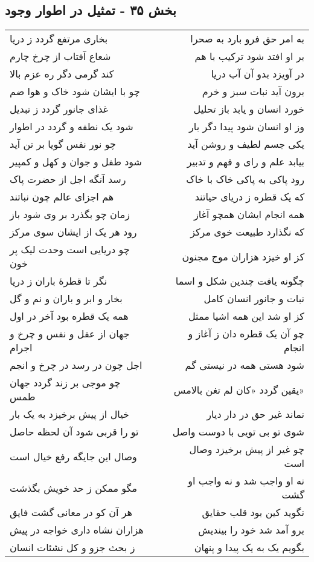 \begin{center}
\section*{بخش ۳۵ - تمثیل در اطوار وجود}
\label{sec:sh035}
\begin{longtable}{l p{0.5cm} r}
بخاری مرتفع گردد ز دریا
&&
به امر حق فرو بارد به صحرا
\\
شعاع آفتاب از چرخ چارم
&&
بر او افتد شود ترکیب با هم
\\
کند گرمی دگر ره عزم بالا
&&
در آویزد بدو آن آب دریا
\\
چو با ایشان شود خاک و هوا ضم
&&
برون آید نبات سبز و خرم
\\
غذای جانور گردد ز تبدیل
&&
خورد انسان و یابد باز تحلیل
\\
شود یک نطفه و گردد در اطوار
&&
وز او انسان شود پیدا دگر بار
\\
چو نور نفس گویا بر تن آید
&&
یکی جسم لطیف و روشن آید
\\
شود طفل و جوان و کهل و کمپیر
&&
بیابد علم و رای و فهم و تدبیر
\\
رسد آنگه اجل از حضرت پاک
&&
رود پاکی به پاکی خاک با خاک
\\
هم اجزای عالم چون نباتند
&&
که یک قطره ز دریای حیاتند
\\
زمان چو بگذرد بر وی شود باز
&&
همه انجام ایشان همچو آغاز
\\
رود هر یک از ایشان سوی مرکز
&&
که نگذارد طبیعت خوی مرکز
\\
چو دریایی است وحدت لیک پر خون
&&
کز او خیزد هزاران موج مجنون
\\
نگر تا قطرهٔ باران ز دریا
&&
چگونه یافت چندین شکل و اسما
\\
بخار و ابر و باران و نم و گل
&&
نبات و جانور انسان کامل
\\
همه یک قطره بود آخر در اول
&&
کز او شد این همه اشیا ممثل
\\
جهان از عقل و نفس و چرخ و اجرام
&&
چو آن یک قطره دان ز آغاز و انجام
\\
اجل چون در رسد در چرخ و انجم
&&
شود هستی همه در نیستی گم
\\
چو موجی بر زند گردد جهان طمس
&&
یقین گردد «کان لم تغن بالامس»
\\
خیال از پیش برخیزد به یک بار
&&
نماند غیر حق در دار دیار
\\
تو را قربی شود آن لحظه حاصل
&&
شوی تو بی تویی با دوست واصل
\\
وصال این جایگه رفع خیال است
&&
چو غیر از پیش برخیزد وصال است
\\
مگو ممکن ز حد خویش بگذشت
&&
نه او واجب شد و نه واجب او گشت
\\
هر آن کو در معانی گشت فایق
&&
نگوید کین بود قلب حقایق
\\
هزاران نشاه داری خواجه در پیش
&&
برو آمد شد خود را بیندیش
\\
ز بحث جزو و کل نشئات انسان
&&
بگویم یک به یک پیدا و پنهان
\\
\end{longtable}
\end{center}
